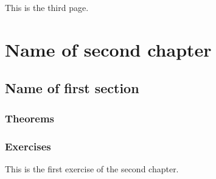 \documentclass[11pt, a4paper]{book}
\begin{document}
\newpage
This is the third page.
%
%
\chapter{Name of second chapter}
%
\section{Name of first section}
\subsection{Theorems}
\subsection{Exercises}
\begin{exercise}
    This is the first exercise of the second chapter.
\end{exercise}
\backmatter
\end{document}
